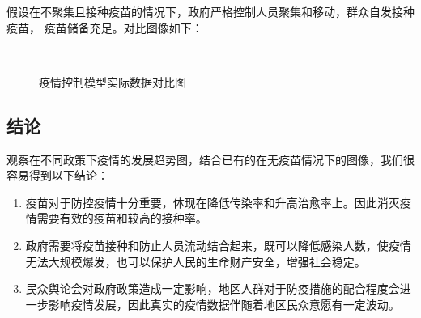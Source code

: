 \documentclass{cumcmthesis}
\begin{document}
\vspace{-0.5cm}
假设在不聚集且接种疫苗的情况下，政府严格控制人员聚集和移动，群众自发接种疫苗，
疫苗储备充足。对比图像如下：
\vspace{-0.4cm}
\begin{figure}[!htb]
    \centering
    \hfill
     \\
    \hfill
    \caption{疫情控制模型实际数据对比图}
\end{figure}

\clearpage
\subsection{结论}
观察在不同政策下疫情的发展趋势图，结合已有的在无疫苗情况下的图像，我们很容易得到以下结论：
\begin{enumerate}
    \item 疫苗对于防控疫情十分重要，体现在降低传染率和升高治愈率上。因此消灭疫情需要有效的疫苗和较高的接种率。
    \item 政府需要将疫苗接种和防止人员流动结合起来，既可以降低感染人数，使疫情无法大规模爆发，也可以保护人民的生命财产安全，增强社会稳定。
    \item 民众舆论会对政府政策造成一定影响，地区人群对于防疫措施的配合程度会进一步影响疫情发展，因此真实的疫情数据伴随着地区民众意愿有一定波动。
\end{enumerate}
\end{document}
